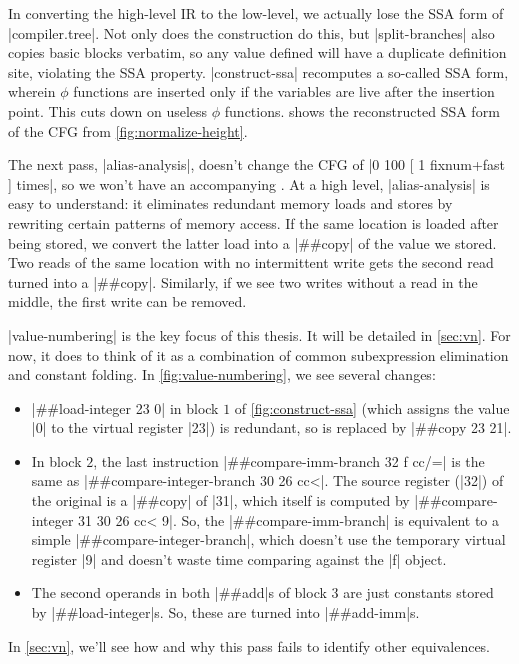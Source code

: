 
In converting the high-level \gls{IR} to the low-level, we actually lose the
\gls{SSA} form of \factor|compiler.tree|.  Not only does the construction do
this, but \factor|split-branches| also copies basic blocks verbatim, so any
value defined will have a duplicate definition site, violating the \gls{SSA}
property.  \factor|construct-ssa| recomputes a so-called 
\gls{SSA} form, wherein $\phi$ functions are inserted only if the variables are
live after the insertion point.  This cuts down on useless $\phi$ 
%
functions.
%
 shows the reconstructed \gls{SSA} form of the
\gls{CFG} from \vref{fig:normalize-height}.

The next pass, \factor|alias-analysis|, doesn't change the \gls{CFG} of
%
\factor|0 100 [ 1 fixnum+fast ] times|,
%
so we won't have an accompanying .  At a high
level, \factor|alias-analysis| is easy to understand: it eliminates redundant
memory loads and stores by rewriting certain patterns of memory access.  If the
same location is loaded after being stored, we convert the latter load into a
\factor|##copy| of the value we stored.  Two reads of the same location with no
intermittent write gets the second read turned into a \factor|##copy|.
Similarly, if we see two writes without a read in the middle, the first write
can be removed.


\factor|value-numbering| is the key focus of this thesis.  It will be detailed
in \vref{sec:vn}.  For now, it does to think of it as a combination of common
subexpression elimination and constant folding.  In \vref{fig:value-numbering}, 
we see several changes:
%
\begin{itemize}
%
  \item \factor|##load-integer 23 0| in block $1$ of \vref{fig:construct-ssa}
  (which assigns the value \factor|0| to the virtual register \factor|23|) is
  redundant, so is replaced by \factor|##copy 23 21|.
%
  \item \begin{flushleft}
  In block $2$, the last instruction
  \factor|##compare-imm-branch 32 f cc/=|
  is the same as
  \factor|##compare-integer-branch 30 26 cc<|.
  The source register (\factor|32|) of the original is a \factor|##copy| of
  \factor|31|, which itself is computed by
  \factor|##compare-integer 31 30 26 cc< 9|.
  So, the \factor|##compare-imm-branch| is equivalent to a simple
  \factor|##compare-integer-branch|, which doesn't use the temporary virtual
  register \factor|9| and doesn't waste time comparing against the \factor|f|
  object.
  \end{flushleft}
%
  \item The second operands in both \factor|##add|s of block $3$ are just
  constants stored by \factor|##load-integer|s.  So, these are turned into
  \factor|##add-imm|s.
\end{itemize}
%
\noindent In \cref{sec:vn}, we'll see how and why this pass fails to identify
other equivalences.

